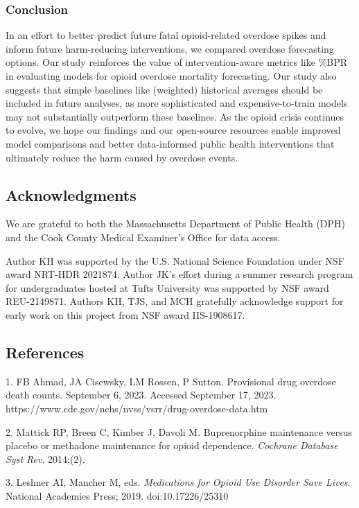 \subsubsection{Conclusion}\label{conclusion}

In an effort to better predict future fatal opioid-related overdose spikes and inform future harm-reducing interventions, we compared overdose forecasting options. Our study reinforces the value of intervention-aware metrics like \%BPR in evaluating models for opioid overdose mortality forecasting. Our study also suggests that simple baselines like (weighted) historical averages should be included in future analyses, as more sophisticated and expensive-to-train models may not substantially outperform these baselines. As the opioid crisis continues to evolve, we hope our findings and our open-source resources enable improved model comparisons and better data-informed public health interventions that ultimately reduce the harm caused by overdose events.

\subsection{Acknowledgments}\label{acknowledgments}

We are grateful to both the Massachusetts Department of Public Health (DPH) and the Cook County Medical Examiner's Office for data access.

Author KH was supported by the U.S. National Science Foundation under NSF award NRT-HDR 2021874. Author JK's effort during a summer research program for undergraduates hosted at Tufts University was supported by NSF award REU-2149871. Authors KH, TJS, and MCH gratefully acknowledge support for early work on this project from NSF award IIS-1908617.

\subsection{References}\label{references}

1. FB Ahmad, JA Cisewsky, LM Rossen, P Sutton. Provisional drug overdose death counts. September 6, 2023. Accessed September 17, 2023. https://www.cdc.gov/nchs/nvss/vsrr/drug-overdose-data.htm

2. Mattick RP, Breen C, Kimber J, Davoli M. Buprenorphine maintenance versus placebo or methadone maintenance for opioid dependence. \emph{Cochrane Database Syst Rev}. 2014;(2).

3. Leshner AI, Mancher M, eds. \emph{Medications for Opioid Use Disorder Save Lives}. National Academies Press; 2019. doi:10.17226/25310


